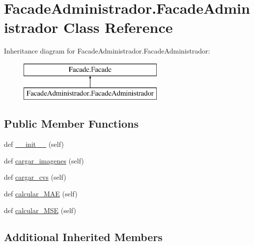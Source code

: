 \hypertarget{class_facade_administrador_1_1_facade_administrador}{}\section{Facade\+Administrador.\+Facade\+Administrador Class Reference}
\label{class_facade_administrador_1_1_facade_administrador}
Inheritance diagram for Facade\+Administrador.\+Facade\+Administrador\+:\begin{figure}[H]
\begin{center}
\leavevmode
\includegraphics[height=2.000000cm]{class_facade_administrador_1_1_facade_administrador}
\end{center}
\end{figure}
\subsection*{Public Member Functions}
\begin{DoxyCompactItemize}
\item 
def \mbox{\hyperlink{class_facade_administrador_1_1_facade_administrador_aaa6a3941eb11cb692c9ecc712db5af0b}{\+\_\+\+\_\+init\+\_\+\+\_\+}} (self)
\item 
def \mbox{\hyperlink{class_facade_administrador_1_1_facade_administrador_abf22dd27c66ba8ba39a947e1f08229f2}{cargar\+\_\+imagenes}} (self)
\item 
def \mbox{\hyperlink{class_facade_administrador_1_1_facade_administrador_a5b00c6cb13896787688c5c73495ea7a0}{cargar\+\_\+cvs}} (self)
\item 
def \mbox{\hyperlink{class_facade_administrador_1_1_facade_administrador_ac65ea555d12893eb9ce5a1ec20c31165}{calcular\+\_\+\+M\+AE}} (self)
\item 
def \mbox{\hyperlink{class_facade_administrador_1_1_facade_administrador_a06b10fce3e70d4292f4c2fae5026643c}{calcular\+\_\+\+M\+SE}} (self)
\end{DoxyCompactItemize}
\subsection*{Additional Inherited Members}


